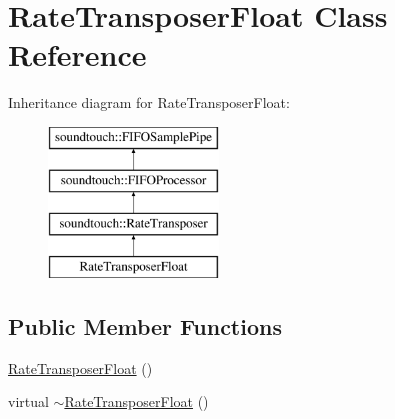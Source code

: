 \hypertarget{class_rate_transposer_float}{}\section{Rate\+Transposer\+Float Class Reference}
\label{class_rate_transposer_float}
Inheritance diagram for Rate\+Transposer\+Float\+:\begin{figure}[H]
\begin{center}
\leavevmode
\includegraphics[height=4.000000cm]{class_rate_transposer_float}
\end{center}
\end{figure}
\subsection*{Public Member Functions}
\begin{DoxyCompactItemize}
\item 
\hyperlink{class_rate_transposer_float_ad0b77904d7bb7e2ecbf9978b8030e6dd}{Rate\+Transposer\+Float} ()
\item 
virtual \hyperlink{class_rate_transposer_float_ab95ccfb1253f16ec5d75c3d4ca4248d6}{$\sim$\+Rate\+Transposer\+Float} ()
\end{DoxyCompactItemize}
